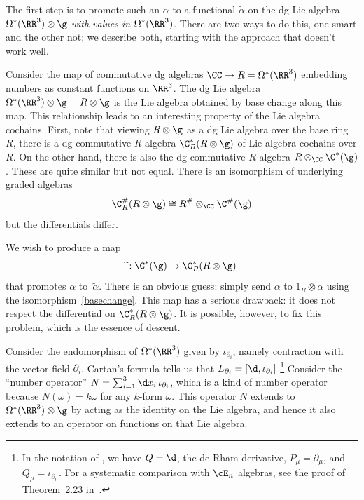 \documentclass[10pt]{amsart}
\begin{document}
The first step is to promote such an $\alpha$ to a functional $\widetilde{\alpha}$ on the dg Lie algebra $\Omega^*(\RR^3) \otimes \g$ {\em with values in $\Omega^*(\RR^3)$}.
There are two ways to do this, one smart and the other not;
we describe both, starting with the approach that doesn't work well.

Consider the map of commutative dg algebras $\CC \to R = \Omega^*(\RR^3)$ embedding numbers as constant functions on $\RR^3$.
The dg Lie algebra $\Omega^*(\RR^3) \otimes \g= R \otimes \g$ is the Lie algebra obtained by base change along this map.
This relationship leads to an interesting property of the Lie algebra cochains.
First, note that viewing $R \otimes \g$ as a dg Lie algebra over the base ring $R$,
there is a dg commutative $R$-algebra $\C^*_{R}(R \otimes \g)$ of Lie algebra cochains over $R$.
On the other hand, there is also the dg commutative $R$-algebra $R \otimes_\CC \C^*(\g)$.
These are quite similar but not equal.
There is an isomorphism of underlying graded algebras
\begin{equation}
\label{basechange}
\C^\#_{R}(R \otimes \g) \cong R^\# \otimes_\CC \C^\#(\g)
\end{equation}
but the differentials differ.

We wish to produce a map
\[
\widetilde{}: \C^*(\g) \to \C^*_{R}(R \otimes \g)
\]
that promotes $\alpha$ to~$\widetilde{\alpha}$.
There is an obvious guess: simply send $\alpha$ to $1_R \otimes \alpha$ using the isomorphism~\eqref{basechange}.
This map has a serious drawback: it does not respect the differential on $\C^*_{R}(R \otimes \g)$.
It is possible, however, to fix this problem, which is the essence of descent.

Consider the endomorphism of $\Omega^*(\RR^3)$ given by $\iota_{\partial_i}$,
namely contraction with the vector field $\partial_i$.
Cartan's formula tells us that $L_{\partial_i} = [\d, \iota_{\partial_i}]$.\footnote{In the notation of \cite{BBBDN}, we have $Q = \d$, the de Rham derivative, $P_\mu = \partial_\mu$, and $Q_\mu = \iota_{\partial_\mu}$.
For a systematic comparison with $\cE_n$ algebras, see the proof of Theorem~2.23 in~\cite{EllSaf}.} 
Consider the ``number operator'' $N = \sum_{i=1}^3 \d x_i \,\iota_{\partial_i}$, which is a kind of number operator
because $N(\omega) = k \omega$ for any $k$-form $\omega$.
This operator $N$ extends to $\Omega^*(\RR^3) \otimes \g$ by acting as the identity on the Lie algebra,
and hence it also extends to an operator on functions on that Lie algebra.
\end{document}
